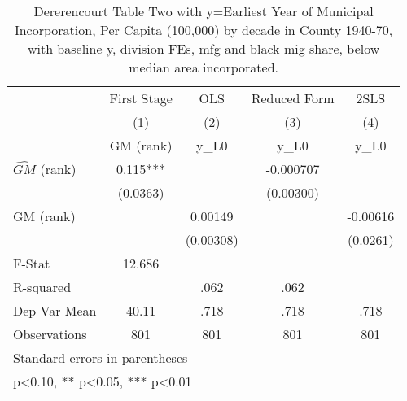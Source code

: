 \begin{table}[htbp]\centering
\def\sym#1{\ifmmode^{#1}\else\(^{#1}\)\fi}
\caption{Dererencourt Table Two with y=Earliest Year of Municipal Incorporation, Per Capita (100,000) by decade in County 1940-70, with baseline y, division FEs, mfg and black mig share, below median area incorporated.}
\begin{tabular}{l*{4}{c}}
\toprule
                    & First Stage   &         OLS   &Reduced Form   &        2SLS   \\
                    &\multicolumn{1}{c}{(1)}&\multicolumn{1}{c}{(2)}&\multicolumn{1}{c}{(3)}&\multicolumn{1}{c}{(4)}\\
                    &\multicolumn{1}{c}{GM  (rank)}&\multicolumn{1}{c}{y\_L0}&\multicolumn{1}{c}{y\_L0}&\multicolumn{1}{c}{y\_L0}\\
\midrule
$\hat{GM}$ (rank)   &       0.115***&               &   -0.000707   &               \\
                    &    (0.0363)   &               &   (0.00300)   &               \\
\addlinespace
GM  (rank)          &               &     0.00149   &               &    -0.00616   \\
                    &               &   (0.00308)   &               &    (0.0261)   \\
\midrule
F-Stat              &      12.686   &               &               &               \\
R-squared           &               &        .062   &        .062   &               \\
Dep Var Mean        &       40.11   &        .718   &        .718   &        .718   \\
Observations        &         801   &         801   &         801   &         801   \\
\bottomrule
\multicolumn{5}{l}{\footnotesize Standard errors in parentheses}\\
\multicolumn{5}{l}{\footnotesize * p<0.10, ** p<0.05, *** p<0.01}\\
\end{tabular}
\end{table}
